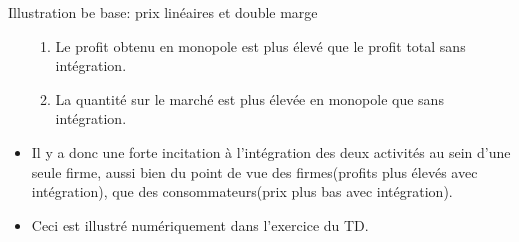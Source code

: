 \begin{frame}[allowframebreaks]{Illustration be base: prix linéaires et double marge}
\begin{itemize}
\begin{enumerate}[$\star$]
\item Le profit obtenu en monopole est plus élevé que le profit total sans intégration. 
\item La quantité sur le marché est plus élevée en monopole que sans intégration. 
\end{enumerate}

\item Il y a donc une forte incitation à l'intégration des deux activités au sein d'une seule firme, 
aussi bien du point de vue des firmes(profits plus élevés avec intégration), que des consommateurs(prix plus bas avec intégration).
\item Ceci est illustré numériquement dans l'exercice du TD.

\end{itemize}
\end{frame}

